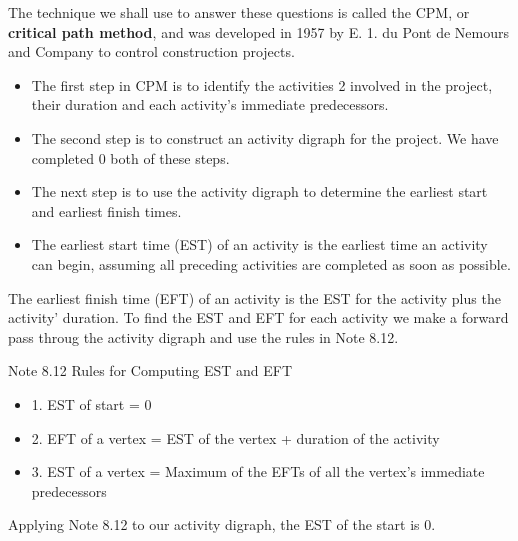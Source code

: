 \documentclass{article}
\begin{document}
The technique we shall use to answer these questions is called the CPM, or \textbf{critical path method}, and was developed in 1957 by E. 1. du Pont de Nemours and Company 
to control construction projects.
\begin{itemize}
    \item The first step in CPM is to identify the activities 2 involved in the project, their duration and each activity's immediate predecessors. 
\item The second step is to construct an activity digraph for the project. We have completed 0 both of these steps. 
\item The next step is to use the activity digraph to determine the earliest start and earliest finish times. 
\item The earliest start time (EST) of an activity is the earliest time an activity can begin, assuming all preceding activities are completed as soon as possible. 
\end{itemize}




 
The earliest finish time (EFT) of an activity is the EST for the activity plus the activity' 
duration. To find the EST and EFT for each activity we make a forward pass throug 
the activity digraph and use the rules in Note 8.12. 
\begin{framed}
Note 8.12 Rules for Computing EST and EFT 
\begin{itemize}
\item 1. EST of start = 0 
\item 2. EFT of a vertex = EST of the vertex + duration of the activity 
\item 3. EST of a vertex = Maximum of the EFTs of all the vertex's immediate predecessors 
\end{itemize}

\end{framed}

Applying Note 8.12 to our activity digraph, the EST of the start is 0. 
\end{document}
